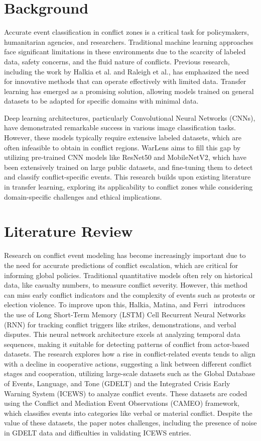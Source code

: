 \documentclass[conference]{IEEEtran}
\begin{document}
\section{Background}
Accurate event classification in conflict zones is a critical task for policymakers, humanitarian agencies, and researchers. Traditional machine learning approaches face significant limitations in these environments due to the scarcity of labeled data, safety concerns, and the fluid nature of conflicts. Previous research, including the work by Halkia et al. and Raleigh et al., has emphasized the need for innovative methods that can operate effectively with limited data. Transfer learning has emerged as a promising solution, allowing models trained on general datasets to be adapted for specific domains with minimal data.

Deep learning architectures, particularly Convolutional Neural Networks (CNNs), have demonstrated remarkable success in various image classification tasks. However, these models typically require extensive labeled datasets, which are often infeasible to obtain in conflict regions. WarLens aims to fill this gap by utilizing pre-trained CNN models like ResNet50 and MobileNetV2, which have been extensively trained on large public datasets, and fine-tuning them to detect and classify conflict-specific events. This research builds upon existing literature in transfer learning, exploring its applicability to conflict zones while considering domain-specific challenges and ethical implications.

\section{Literature Review}

Research on conflict event modeling has become increasingly important due to the need for accurate predictions of conflict escalation, which are critical for informing global policies. Traditional quantitative models often rely on historical data, like casualty numbers, to measure conflict severity. However, this method can miss early conflict indicators and the complexity of events such as protests or election violence. To improve upon this, Halkia, Matina, and Ferri~\cite{b1} introduces the use of Long Short-Term Memory (LSTM) Cell Recurrent Neural Networks (RNN) for tracking conflict triggers like strikes, demonstrations, and verbal disputes. This neural network architecture excels at analyzing temporal data sequences, making it suitable for detecting patterns of conflict from actor-based datasets. The research explores how a rise in conflict-related events tends to align with a decline in cooperative actions, suggesting a link between different conflict stages and cooperation, utilizing large-scale datasets such as the Global Database of Events, Language, and Tone (GDELT) and the Integrated Crisis Early Warning System (ICEWS) to analyze conflict events. These datasets are coded using the Conflict and Mediation Event Observations (CAMEO) framework, which classifies events into categories like verbal or material conflict. Despite the value of these datasets, the paper notes challenges, including the presence of noise in GDELT data and difficulties in validating ICEWS entries.
\end{document}
